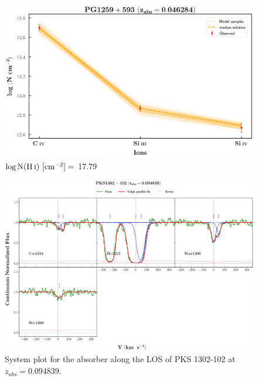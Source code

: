   \begin{figure}[!h]
      \centering
      \includegraphics[width=0.9\linewidth]{Ionisation-Modelling-Plots/pg1259-z=0.046284-compII_logZ=-1.png}
      \caption{$\log \text{N}(\ion{H}{i}) \ [\text{cm}^{-2}]=$ 17.79}
  \end{figure}
  
  \restoregeometry
  
  \newpage
  \thispagestyle{empty}

  \begin{landscape}
  
  \begin{figure}
      \centering
      \vspace{-10mm}
      \hspace*{-20mm}
      \includegraphics[width=1.1\linewidth]{System-Plots/PKS1302-102_z=0.094839_sys_plot.png}
      \caption{System plot for the absorber along the LOS of PKS 1302-102 at $z_{abs} = 0.094839$. }
  \end{figure}
  
  \end{landscape}
  
